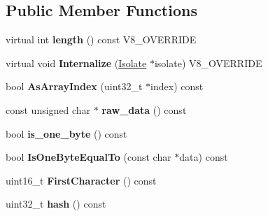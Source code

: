 \subsection*{Public Member Functions}
\begin{DoxyCompactItemize}
\item 
\hypertarget{classv8_1_1internal_1_1_ast_raw_string_ac33af36ba73a2c8f921675ba2c618092}{}virtual int {\bfseries length} () const V8\+\_\+\+O\+V\+E\+R\+R\+I\+D\+E\label{classv8_1_1internal_1_1_ast_raw_string_ac33af36ba73a2c8f921675ba2c618092}

\item 
\hypertarget{classv8_1_1internal_1_1_ast_raw_string_ab8aa03cf4e49bdc41f0cc4d1c665fbd5}{}virtual void {\bfseries Internalize} (\hyperlink{classv8_1_1internal_1_1_isolate}{Isolate} $\ast$isolate) V8\+\_\+\+O\+V\+E\+R\+R\+I\+D\+E\label{classv8_1_1internal_1_1_ast_raw_string_ab8aa03cf4e49bdc41f0cc4d1c665fbd5}

\item 
\hypertarget{classv8_1_1internal_1_1_ast_raw_string_a3d50a9463da53958aad96da0729eda13}{}bool {\bfseries As\+Array\+Index} (uint32\+\_\+t $\ast$index) const \label{classv8_1_1internal_1_1_ast_raw_string_a3d50a9463da53958aad96da0729eda13}

\item 
\hypertarget{classv8_1_1internal_1_1_ast_raw_string_a19b4f332aee9c58ebccf9130576828f0}{}const unsigned char $\ast$ {\bfseries raw\+\_\+data} () const \label{classv8_1_1internal_1_1_ast_raw_string_a19b4f332aee9c58ebccf9130576828f0}

\item 
\hypertarget{classv8_1_1internal_1_1_ast_raw_string_af8f3bf741a731825048c0ade6dfc4b14}{}bool {\bfseries is\+\_\+one\+\_\+byte} () const \label{classv8_1_1internal_1_1_ast_raw_string_af8f3bf741a731825048c0ade6dfc4b14}

\item 
\hypertarget{classv8_1_1internal_1_1_ast_raw_string_a447f234bce2635272c0ce6e3d65247d0}{}bool {\bfseries Is\+One\+Byte\+Equal\+To} (const char $\ast$data) const \label{classv8_1_1internal_1_1_ast_raw_string_a447f234bce2635272c0ce6e3d65247d0}

\item 
\hypertarget{classv8_1_1internal_1_1_ast_raw_string_a913e377b7afff07dc27fbd81932a2cb4}{}uint16\+\_\+t {\bfseries First\+Character} () const \label{classv8_1_1internal_1_1_ast_raw_string_a913e377b7afff07dc27fbd81932a2cb4}

\item 
\hypertarget{classv8_1_1internal_1_1_ast_raw_string_a0e285ff9f228e2cb92cda7dc2461e2de}{}uint32\+\_\+t {\bfseries hash} () const \label{classv8_1_1internal_1_1_ast_raw_string_a0e285ff9f228e2cb92cda7dc2461e2de}

\end{DoxyCompactItemize}
